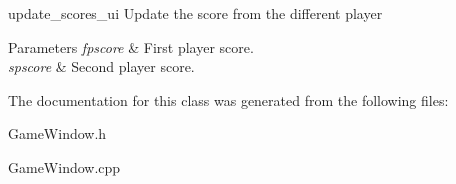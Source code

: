 update\+\_\+scores\+\_\+ui Update the score from the different player 


\begin{DoxyParams}{Parameters}
{\em fpscore} & First player score. \\
\hline
{\em spscore} & Second player score. \\
\hline
\end{DoxyParams}


The documentation for this class was generated from the following files\+:\begin{DoxyCompactItemize}
\item 
Game\+Window.\+h\item 
Game\+Window.\+cpp\end{DoxyCompactItemize}
